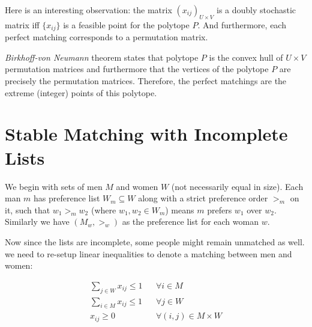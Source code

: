 \documentclass[a4paper,UKenglish,cleveref, autoref]{lipics-v2019}
\theoremstyle{definition}
\begin{document}
Here is an interesting observation: the matrix $(x_{ij})_{U \times V}$ is a doubly stochastic matrix iff $\{x_{ij}\}$ is a feasible point for the polytope $P$. And furthermore, each perfect matching corresponds to a permutation matrix.

\textsl{Birkhoff-von Neumann} theorem states that polytope $P$ is the convex hull of $U \times V$ permutation matrices and furthermore that the vertices of the polytope $P$ are precisely the permutation matrices. Therefore, the perfect matchings are the extreme (integer) points of this polytope.




\section{Stable Matching with Incomplete Lists}

We begin with sets of men $M$ and women $W$ (not necessarily equal in size). Each man $m$ has preference list $W_m \subseteq W$ along with a strict preference order $>_m$ on it, such that $w_1 >_m w_2$ (where $w_1, w_2 \in W_m$) means $m$ prefers $w_1$ over $w_2$. Similarly we have $(M_w, >_w)$ as the preference list for each woman $w$.

Now since the lists are incomplete, some people might remain unmatched as well. we need to re-setup linear inequalities to denote a matching between men and women:


\begin{align}
    \sum_{j \in W} x_{ij} \leq 1 && \forall i \in M \\
    \sum_{i \in M} x_{ij} \leq 1 && \forall j \in W \\
    x_{ij} \geq 0 && \forall (i,j) \in M \times W
\end{align}
\end{document}
